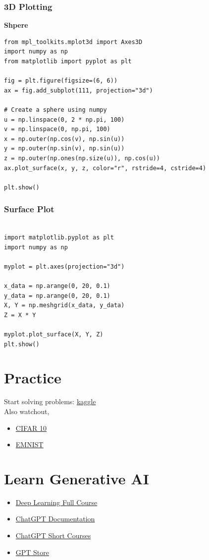 \documentclass{book}
\begin{document}
\subsection{3D Plotting}
\textbf{Shpere}
\begin{verbatim}
from mpl_toolkits.mplot3d import Axes3D
import numpy as np
from matplotlib import pyplot as plt

fig = plt.figure(figsize=(6, 6))
ax = fig.add_subplot(111, projection="3d")

# Create a sphere using numpy
u = np.linspace(0, 2 * np.pi, 100)
v = np.linspace(0, np.pi, 100)
x = np.outer(np.cos(v), np.sin(u))
y = np.outer(np.sin(v), np.sin(u))
z = np.outer(np.ones(np.size(u)), np.cos(u))
ax.plot_surface(x, y, z, color="r", rstride=4, cstride=4)

plt.show()

\end{verbatim}
\subsection{Surface Plot}
\begin{verbatim}
   
import matplotlib.pyplot as plt
import numpy as np

myplot = plt.axes(projection="3d")

x_data = np.arange(0, 20, 0.1)
y_data = np.arange(0, 20, 0.1)
X, Y = np.meshgrid(x_data, y_data)
Z = X * Y

myplot.plot_surface(X, Y, Z)
plt.show()

\end{verbatim}
\chapter{Practice}
Start solving problems: \href{https://www.kaggle.com/datasets } {kaggle}\\
Also watchout,
\begin{itemize}
	\item \href{https://www.cs.toronto.edu/~kriz/cifar.html}{CIFAR 10}
	\item \href{https://www.kaggle.com/datasets/crawford/emnist }{EMNIST}
\end{itemize}
\chapter{Learn Generative AI}
\begin{itemize}
	\item \href{ https://www.coursera.org/specializations/deep-learning}{Deep Learning Full Course}
	\item \href{ https://platform.openai.com/docs/guides/text-generation}{ChatGPT Documentation}
	\item \href{ https://www.deeplearning.ai/short-courses/chatgpt-prompt-engineering-for-developers/}{ChatGPT Short Courses}
	\item \href{ https://openai.com/index/introducing-the-gpt-store/}{GPT Store}
\end{itemize}
\end{document}
